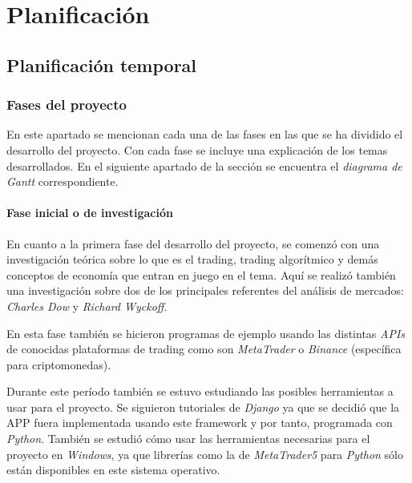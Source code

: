 

\chapter{Planificación}

\section{Planificación temporal}

\subsection{Fases del proyecto}

En este apartado se mencionan cada una de las fases en las que se ha dividido el desarrollo del proyecto. Con cada fase se incluye una explicación de los temas desarrollados. En el siguiente apartado de la sección se encuentra el \textit{diagrama de Gantt} correspondiente.

\subsubsection{Fase inicial o de investigación}

En cuanto a la primera fase del desarrollo del proyecto, se comenzó con una investigación teórica sobre lo que es el trading, trading algorítmico y demás conceptos de economía que entran en juego en el tema. Aquí se realizó también una investigación sobre dos de los principales referentes del análisis de mercados: \textit{Charles Dow} y \textit{Richard Wyckoff}. \newline

En esta fase también se hicieron programas de ejemplo usando las distintas \textit{APIs} de conocidas plataformas de trading como son \textit{MetaTrader} o \textit{Binance} (específica para criptomonedas). \newline

Durante este período también se estuvo estudiando las posibles herramientas a usar para el proyecto. Se siguieron tutoriales de \textit{Django} ya que se decidió que la APP fuera implementada usando este framework y por tanto, programada con \textit{Python}. También se estudió cómo usar las herramientas necesarias para el proyecto en \textit{Windows}, ya que librerías como la de \textit{MetaTrader5} para \textit{Python} sólo están disponibles en este sistema operativo. \newline


